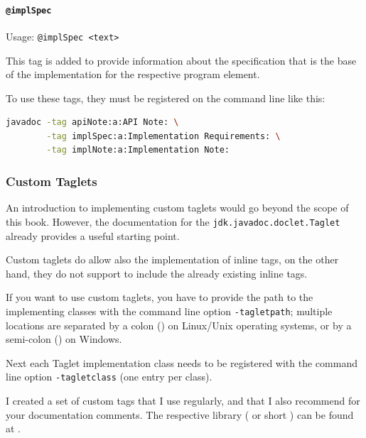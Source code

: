 \paragraph{\lstinline|@implSpec|}\label{sec:TagImplSpec} Usage: \lstinline|@implSpec <text>|

This tag is added to provide information about the specification that is the base of the implementation for the respective program element.

To use these tags, they must be registered on the command line like this:
\begin{lstlisting}[numbers=none,language=sh]
javadoc -tag apiNote:a:API Note: \
        -tag implSpec:a:Implementation Requirements: \
        -tag implNote:a:Implementation Note:
\end{lstlisting}


\subsubsection{Custom Taglets}\label{sec:CustomTaglets}
An introduction to implementing custom taglets would go beyond the scope of this book. However, the documentation for the \lstinline|jdk.javadoc.doclet.Taglet| \autocite{ORACLE_DOC_TAGLET_INTERFACE} already provides a useful starting point.

Custom taglets do allow also the implementation of inline tags, on the other hand, they do not support to include the already existing inline tags.

If you want to use custom taglets, you have to provide the path to the implementing classes with the command line option \mbox{\texttt{-tagletpath}}; multiple locations are separated by a colon (\bdq{:}) on Linux/Unix operating systems, or by a semi-colon (\bdq{;}) on Windows.

Next each Taglet implementation class needs to be registered with the command line option \mbox{\texttt{-tagletclass}} (one entry per class).

I created a set of custom tags that I use regularly, and that I also recommend for your documentation comments. The respective library ( or short ) can be found at \autocite{TQUADRAT_ORG_FOUNDATION_JAVADOC}.

